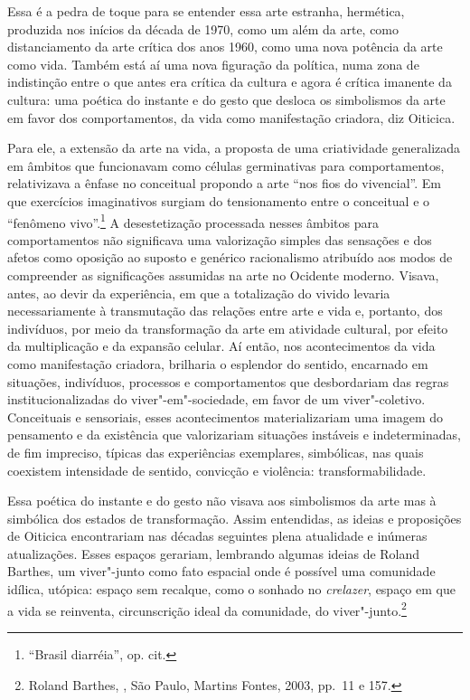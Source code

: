 Essa é a pedra de toque para se entender essa arte estranha, hermética,
produzida nos inícios da década de 1970, como um além da arte, como
distanciamento da arte crítica dos anos 1960, como uma nova potência da
arte como vida. Também está aí uma nova figuração da política, numa zona
de indistinção entre o que antes era crítica da cultura e agora é
crítica imanente da cultura: uma poética do instante e do gesto que
desloca os simbolismos da arte em favor dos comportamentos, da vida como
manifestação criadora, diz Oiticica.

Para ele, a extensão da arte na vida, a proposta de uma criatividade
generalizada em âmbitos que funcionavam como células germinativas para
comportamentos, relativizava a ênfase no conceitual propondo a
arte ``nos fios do vivencial''. Em que exercícios imaginativos surgiam do
tensionamento entre o conceitual e o ``fenômeno vivo''.\footnote{``Brasil diarréia'', op. cit.}
A desestetização processada nesses âmbitos para
comportamentos não significava uma valorização simples das sensações e
dos afetos como oposição ao suposto e genérico racionalismo atribuído
aos modos de compreender as significações assumidas na arte no Ocidente
moderno. Visava, antes, ao devir da experiência, em que a totalização do
vivido levaria necessariamente à transmutação das relações entre arte e
vida e, portanto, dos indivíduos, por meio da transformação da arte em
atividade cultural, por efeito da multiplicação e da expansão celular.
Aí então, nos acontecimentos da vida como manifestação criadora,
brilharia o esplendor do sentido, encarnado em situações, indivíduos,
processos e comportamentos que desbordariam das regras
institucionalizadas do viver"-em"-sociedade, em favor de um
viver"-coletivo. Conceituais e sensoriais, esses acontecimentos
materializariam uma imagem do pensamento e da existência que
valorizariam situações instáveis e indeterminadas, de fim impreciso,
típicas das experiências exemplares, simbólicas, nas quais coexistem
intensidade de sentido, convicção e violência: transformabilidade.

Essa poética do instante e do gesto não visava aos simbolismos da arte
mas à simbólica dos estados de transformação. Assim entendidas, as
ideias e proposições de Oiticica encontrariam nas décadas seguintes
plena atualidade e inúmeras atualizações. Esses espaços gerariam,
lembrando algumas ideias de Roland Barthes, um viver"-junto como fato
espacial onde é possível uma comunidade idílica, utópica: espaço sem
recalque, como o sonhado no \emph{crelazer}, espaço em que a vida se
reinventa, circunscrição ideal da comunidade, do viver"-junto.\footnote{Roland
  Barthes, {}, São Paulo, Martins Fontes, 2003, pp.~11 e 157.}

